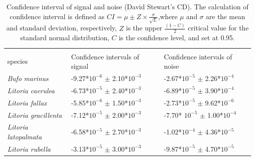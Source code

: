 



\begin{table}[htb!]
\centering
\caption[Confidence interval for CD recordings]{Confidence interval of signal and noise (David Stewart's CD). The calculation of confidence interval is defined as
$ CI=\mu \pm Z \times \frac{\sigma}{\sqrt{L}}$,where $\mu$ and $\sigma$ are the mean and standard deviation, respectively, $Z$ is the upper $\frac{(1-C)}{2}$ critical value for the standard normal distribution, $C$ is the confidence level, and set at 0.95.}
\label{tab:CI_CD}
\begin{tabular}{lll}
\hline\hline
    \backslashbox{Frog \\ species}{Parameters}                      & Confidence intervals of signal & Confidence intervals of noise \\ \hline
\textit{Bufo marinus}        &  -9.27*$10^{-6}$ $\pm$ 2.10*$10^{-3}$ &  -2.67*$10^{-5}$ $\pm$ 2.26*$10^{-4}$                             \\ 
\textit{Litoria caerulea}    &      -6.73*$10^{-5}$ $\pm$ 2.40*$10^{-3}$     &                              -6.89*$10^{-5}$ $\pm$ 3.90*$10^{-4}$ \\ 
\textit{Litoria fallax}      &   -5.85*$10^{-6}$ $\pm$ 1.50*$10^{-3}$                             &                              -2.73*$10^{-5}$ $\pm$ 9.62*$10^{-6}$ \\ 
\textit{Litoria gracillenta} &     -7.12*$10^{-5}$ $\pm$ 2.00*$10^{-3}$                           &                              -7.70* $10^{-5}$ $\pm$ 1.00*$10^{-4}$ \\ 
\textit{Litoria latopalmata} &   -6.58*$10^{-5}$ $\pm$ 2.70*$10^{-3}$                            &                              -1.02*$10^{-4}$ $\pm$ 4.36*$10^{-5}$ \\ 
\textit{Litoria rubella}     &   -3.13*$10^{-5}$ $\pm$ 3.00*$10^{-3}$                           &                              -9.87*$10^{-5}$ $\pm$ 4.70*$10^{-5}$ \\ \hline\hline
\end{tabular}
\end{table}




